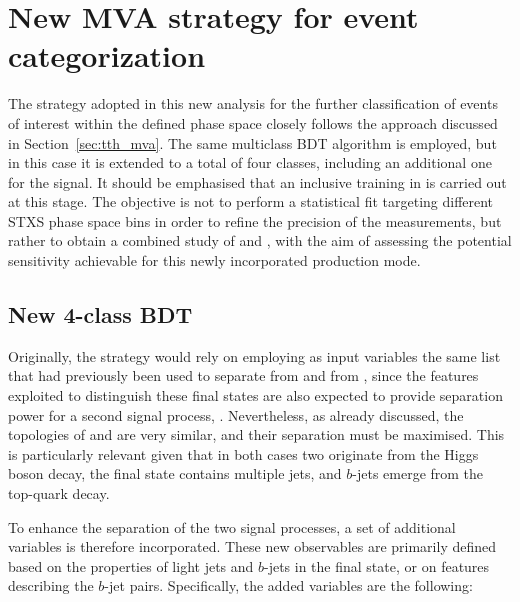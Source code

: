 \section{New MVA strategy for event categorization}

The strategy adopted in this new analysis for the further classification of events of interest within the defined phase space closely follows the approach discussed in Section~\ref{sec:tth_mva}. The same multiclass BDT algorithm is employed, but in this case it is extended to a total of four classes, including an additional one for the \thtt signal.
It should be emphasised that an inclusive training in \pth is carried out at this stage. The objective is not to perform a statistical fit targeting different STXS phase space bins in order to refine the precision of the measurements, but rather to obtain a combined study of \ttH and \thqb, with the aim of assessing the potential sensitivity achievable for this newly incorporated production mode.

\subsection{New 4-class BDT}
Originally, the strategy would rely on employing as input variables the same list that had previously been used to separate \ttH from \ztautau and from \ttbar, since the features exploited to distinguish these final states are also expected to provide separation power for a second signal process, \thqb.
Nevertheless, as already discussed, the topologies of \ttHtt and \thtt are very similar, and their separation must be maximised. This is particularly relevant given that in both cases two \tauhad originate from the Higgs boson decay, the final state contains multiple jets, and $b$-jets emerge from the top-quark decay.

To enhance the separation of the two signal processes, a set of additional variables is therefore incorporated. These new observables are primarily defined based on the properties of light jets and $b$-jets in the final state, or on features describing the $b$-jet pairs. Specifically, the added variables are the following:

